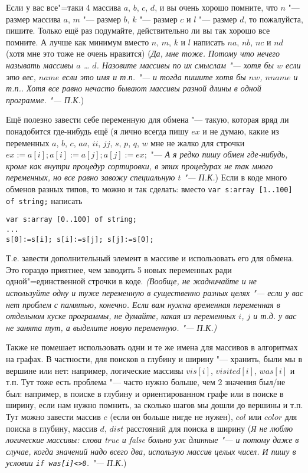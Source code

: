 Если у вас все"=таки 4 массива $a$, $b$, $c$, $d$, 
и вы очень хорошо помните, что $n$ "--- размер массива $a$, $m$ "--- размер $b$, $k$ "--- размер 
$c$ и $l$ "--- размер $d$, то пожалуйста, пишите. Только ещё раз подумайте, действительно ли вы так 
хорошо все помните. А лучше как минимум вместо $n$, $m$, $k$ и $l$ написать $na$, $nb$, $nc$ и $nd$ (хотя мне 
это тоже не очень нравится) (\textsl{Да, мне тоже. Потому что нечего называть массивы $a$ \dots{} 
$d$. Назовите массивы по их смыслам "--- хотя бы $w$ если это вес, $name$ если это имя и т.п. "--- 
и тогда пишите хотя бы $nw$, $nname$ и т.п.. Хотя все равно нечасто бывают массивы разной длины в одной программе. "--- 
П.К.})

  Ещё полезно завести себе переменную для обмена "--- такую, которая вряд ли понадобится где-нибудь ещё 
(я лично всегда пишу $ex$ и не думаю, какие из переменных $a$, $b$, $c$, $aa$, $ii$, $jj$, $s$, 
$p$, $q$, $w$ мне не жалко для строчки $ex:=a[i]; a[i]:=a[j]; a[j]:=ex;$ "--- \textsl{А я редко 
пишу обмен где-нибудь, кроме как внутри процедур сортировки, в этих процедурах не так много 
переменных, но все равно завожу специальную $t$ "--- П.К.})
Если в коде много обменов разных типов, то можно и так сделать: вместо \texttt{var s:array [1..100] 
of string;} написать
\begin{codesampleo}\begin{verbatim}
var s:array [0..100] of string;
...
s[0]:=s[i]; s[i]:=s[j]; s[j]:=s[0];
\end{verbatim}
\end{codesampleo}
Т.е. завести дополнительный элемент в массиве и использовать его для обмена. Это гораздо приятнее, чем заводить 
5 новых переменных ради одной"=единственной строчки в коде. \textsl{(Вообще, не жадничайте и не используйте одну и туже переменную в существенно разных целях "--- если у вас нет проблем с памятью, конечно. Если вам нужна временная переменная в отдельном куске программы, не думайте, какая из переменных $i$, $j$ и т.д. у вас не занята тут, а выделите новую переменную. "--- П.К.)}

Также не помешает использовать одни и те же имена для массивов в алгоритмах на графах. В частности, для поисков в глубину и 
ширину "--- хранить, были мы в вершине или нет: например, логические массивы $vis[i]$, 
$visited[i]$, $was[i]$ и т.п. Тут тоже есть проблема "--- часто нужно больше, чем 2 значения был/не 
был: например, в поиске в глубину и ориентированном графе или в поиске в ширину, если нам нужно 
помнить, за сколько шагов мы дошли до вершины и т.п. Тут можно завести массив $c$ (если он больше нигде не 
нужен), $col$ или $color$ для поиска в глубину, массив $d$, $dist$ расстояний для поиска в ширину 
(\textsl{Я не люблю логические массивы: слова true и false больно уж длинные "--- и потому даже в 
случае, когда значений надо всего два, использую массив целых чисел. И пишу в условии 
\texttt{if was[i]<>0}. "--- П.К.})

